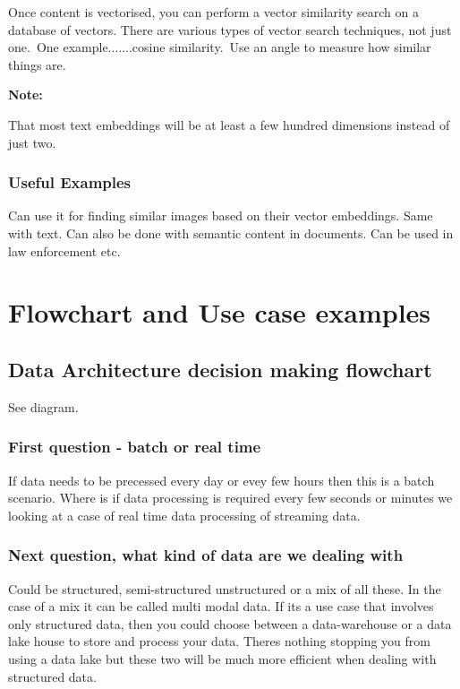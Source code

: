\documentclass[a4paper, 11pt]{book}
\newenvironment{note}{
    \begin{siderule}
        \textbf{Note: }
        }{
    \end{siderule}}
\begin{document}
    Once content is vectorised, you can perform a vector similarity search on a database of vectors.
    There are various types of vector search techniques, not just one.\ One example.......cosine similarity.\ Use an angle to measure how similar things are.

    \begin{note}
        That most text embeddings will be at least a few hundred dimensions instead of just two.
    \end{note}

    \subsubsection{Useful Examples}
    Can use it for finding similar images based on their vector embeddings.
    Same with text.
    Can also be done with semantic content in documents.
    Can be used in law enforcement etc.


    \section{Flowchart and Use case examples}

    \subsection{Data Architecture decision making flowchart}
    See diagram.

    \subsubsection{First question - batch or real time}
    If data needs to be precessed every day or evey few hours then this is a batch scenario.
    Where is if data processing is required every few seconds or minutes we looking at a case of real time data processing of streaming data.

    \subsubsection{Next question, what kind of data are we dealing with}
    Could be structured, semi-structured unstructured or a mix of all these.
    In the case of a mix it can be called multi modal data.
    If its a use case that involves only structured data, then you could choose between a data-warehouse or a data lake house to store and process your data.
    Theres nothing stopping you from using a data lake but these two will be much more efficient when dealing with structured data.
\end{document}

